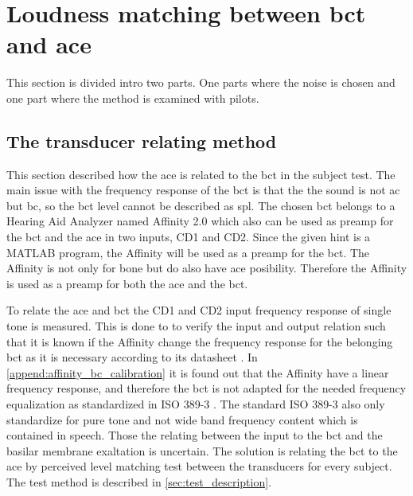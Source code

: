 
\section{Loudness matching between \gls{bct} and \gls{ace}}
\label{sec:loudness_match}
This section is divided intro two parts. One parts where the noise is chosen and one part where the method is examined with pilots.


\subsection{The transducer relating method}

This section described how the \gls{ace} is related to the \gls{bct} in the subject test. The main issue with the frequency response of the \gls{bct} is that the the sound is not \gls{ac} but \gls{bc}, so the \gls{bct} level cannot be described as \gls{spl}. The chosen \gls{bct} belongs to a Hearing Aid Analyzer named Affinity 2.0 \citep{affinity_20} which also can be used as preamp for the \gls{bct} and the \gls{ace} in two inputs, CD1 and CD2. Since the given \gls{hint} is a MATLAB program, the Affinity will be used as a preamp for the \gls{bct}. The Affinity is not only for bone but do also have  \gls{ace} posibility. Therefore the Affinity is used as a preamp for both the \gls{ace} and the \gls{bct}. 


To relate the \gls{ace} and \gls{bct} the CD1 and CD2 input frequency response of single tone is measured. This is done to to verify the input and output relation such that it is known if the Affinity change the frequency response for the belonging \gls{bct} as it is necessary according to its datasheet \citep{radioear_b81}. In  \autoref{append:affinity_bc_calibration} it is found out that the Affinity have a linear frequency response, and therefore the \gls{bct} is not adapted for the needed frequency equalization as standardized in ISO 389-3 \citep{iso_389-3}. The standard ISO 389-3 \citep{iso_389-3} also only standardize for pure tone and not wide band frequency content which is contained in speech. Those the relating between the input to the \gls{bct} and the basilar membrane exaltation is uncertain. The solution is relating the \gls{bct} to the \gls{ace} by perceived level matching test between the transducers for every subject. The test method is described in \autoref{sec:test_description}.


